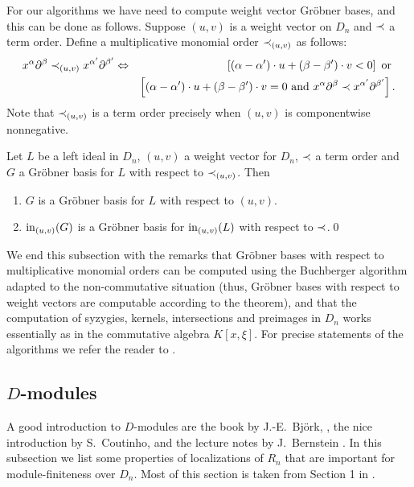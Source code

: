 For our algorithms 
we have need to compute weight vector Gr\"obner bases, and this can be
done as follows. Suppose $(u,v)$ is a weight vector on $D_n$ and
$\prec$ a term order. Define a
multiplicative monomial order $\prec_{(u,v)}$ as follows:
\begin{eqnarray*}
x^\alpha\partial^\beta\prec_{(u,v)}
x^{\alpha'}\partial^{\beta'}&\Leftrightarrow& \left[(\alpha-\alpha')\cdot
u+(\beta-\beta')\cdot 
v<0\right] \text{ or }\\
&&\left[(\alpha-\alpha')\cdot
u+(\beta-\beta')\cdot 
v=0 \text{ and } x^\alpha\partial^\beta\prec x^{\alpha'}\partial^{\beta'}\right].
\end{eqnarray*}
Note that $\prec_{(u,v)}$ is a term order precisely when $(u,v)$ is
componentwise nonnegative.
\begin{theorem}
Let $L$ be a left ideal in $D_n$, $(u,v)$ a weight vector for $D_n$, 
$\prec$ a term
order and $G$ a Gr\"obner basis for $L$ with respect to
$\prec_{(u,v)}$. Then
\begin{enumerate}
\item $G$ is a Gr\"obner basis for $L$ with respect to $(u,v)$.
\item $\operatorname{in}_{(u,v)}(G)$ is a Gr\"obner basis for $\operatorname{in}_{(u,v)}(L)$ with
respect to $\prec$.\qed
\end{enumerate}
\end{theorem}
We end this subsection with the remarks that Gr\"obner bases with
respect to multiplicative monomial
 orders can be computed using the Buchberger algorithm
adapted to the non-commutative situation (thus, Gr\"obner bases with
respect to  weight vectors are computable according to the theorem), 
and that the computation of
syzygies, kernels, intersections and preimages in $D_n$ 
works essentially as in the commutative algebra $K[x,\xi]$. For precise
statements of the algorithms we refer the reader to \cite{DM:SST}.

\subsection{$D$-modules} 
A good introduction to $D$-modules
 are the book by J.-E.\ Bj\"ork,
\cite{DM:B}, the nice introduction \cite{DM:Coutinho} by S.~Coutinho, 
and the lecture notes by J.~Bernstein
 \cite{DM:Bernstein-notes}. 
In this subsection  we list some properties of
localizations of $R_n$ that are important for module-finiteness over
 $D_n$. Most of this section is taken from Section 1 in \cite{DM:B}.

